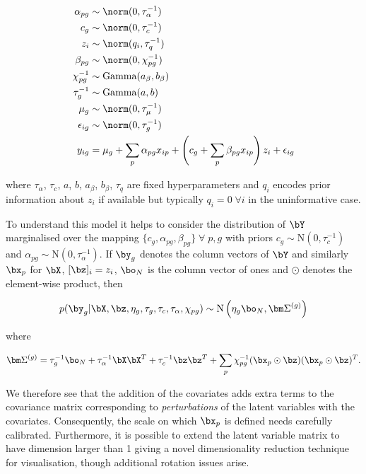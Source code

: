 \begin{equation}
\begin{aligned}
\alpha_{pg} & \sim \norm(0, \tau_\alpha^{-1}) \\
c_g & \sim \norm(0, \tau_c^{-1}) \\
z_i & \sim \norm(q_i, \tau_q^{-1}) \\
\beta_{pg} & \sim \norm(0, \chi_{pg}^{-1}) \\
\chi_{pg}^{-1} & \sim \text{Gamma}(a_\beta, b_\beta) \\
\tau_{g}^{-1} & \sim \text{Gamma}(a, b) \\
\mu_{g} & \sim \norm(0, \tau_\mu^{-1}) \\
\epsilon_{ig} & \sim \norm(0, \tau_g^{-1}) \\
y_{ig} & = \mu_g + \sum_p \alpha_{pg} x_{ip} + \left( c_g + \sum_p \beta_{pg} x_{ip} \right) z_i + \epsilon_{ig}
\end{aligned}
\end{equation}

where $\tau_\alpha$, $\tau_c$, $a$, $b$, $a_\beta$, $b_\beta$, $\tau_q$ are fixed hyperparameters and $q_i$ encodes prior information about $z_i$ if available but typically $q_i = 0 \; \forall i$ in the uninformative case.

To understand this model it helps to consider the distribution of $\bY$ marginalised over the mapping $\{ c_g, \alpha_{pg}, \beta_{pg}\} \; \forall \; p,g$ with priors $c_g \sim \mathrm{N}(0, \tau_c^{-1})$ and $\alpha_{pg} \sim \mathrm{N}(0, \tau_\alpha^{-1})$. If $\by_g$ denotes the column vectors of $\bY$ and similarly $\bx_p$ for $\bX$, $[\bz]_i = z_i$, $\bo_N$ is the column vector of ones and $\odot$ denotes the element-wise product, then

\begin{equation}
	p(\by_g | \bX, \bz, \eta_g, \tau_g, \tau_c, \tau_\alpha, \chi_{pg}) \sim
\mathrm{N}\left(
\eta_g \bo_N, \bm \Sigma^{(g)}
\right)
\end{equation}

where

\begin{equation}
\bm \Sigma^{(g)} =
\tau_g^{-1} \bo_N +
\tau_\alpha^{-1} \bX \bX^T +
\tau_c^{-1} \bz \bz^T +
 \sum_p  \chi_{pg}^{-1} (\bx_p \odot \bz) (\bx_p \odot \bz)^T.
\end{equation}

We therefore see that the addition of the covariates adds extra terms to the covariance matrix corresponding to \emph{perturbations} of the latent variables with the covariates. Consequently, the scale on which $\bx_p$ is defined needs carefully calibrated. Furthermore, it is possible to extend the latent variable matrix to have dimension larger than 1 giving a novel dimensionality reduction technique for visualisation, though additional rotation issues arise.



